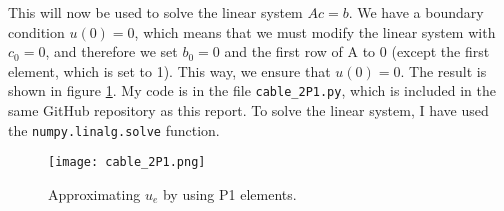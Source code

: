 \documentclass[10pt, a4paper]{amsart}
\numberwithin{figure}{section}
\numberwithin{table}{section}
\begin{document}
This will now be used to solve the linear system $Ac = b$. We have a boundary
condition $u(0) = 0$, which means that we must modify the linear system with
$c_0 = 0$, and therefore we set $b_0 = 0$ and the first row of A to 0 (except
the first element, which is set to 1). This way, we ensure that $u(0)=0$. The
result is shown in figure \ref{fig:cable_2P1}. My code is in the file
\texttt{cable\_2P1.py}, which is included in the same GitHub repository as this
report. To solve the linear system, I have used the \texttt{numpy.linalg.solve}
function.

\begin{figure}
       \texttt{[image: cable\_2P1.png]}
       \caption{Approximating $u_e$ by using P1 elements.}
       \label{fig:cable_2P1}
\end{figure}

\end{document}
